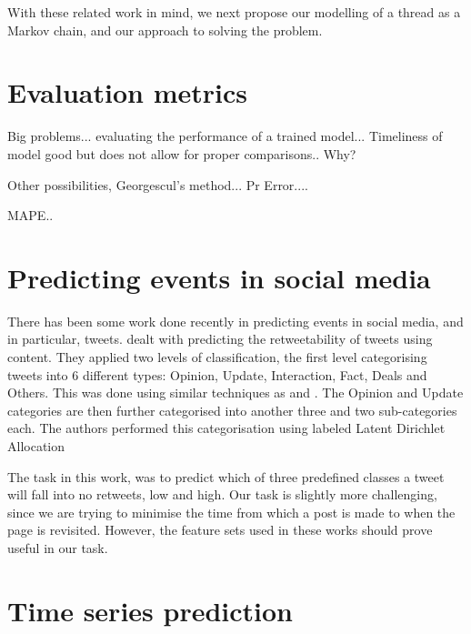 
With these related work in mind, we next propose our modelling of a thread as a 
Markov chain, and our approach to solving the problem.


\section{Evaluation metrics}

Big problems... evaluating the performance of a trained model...
Timeliness of model good but does not allow for proper comparisons.. Why?

Other possibilities, Georgescul's method... Pr Error.... 

MAPE..

\section{Predicting events in social media}
There has been some work done recently in predicting events in social media, and 
in particular, tweets. 
 dealt with predicting the retweetability of tweets using 
content. They applied two levels of classification, the first level categorising 
tweets into 6 different types: Opinion, Update, Interaction, Fact, Deals and 
Others. This was done using similar techniques as  and 
. The Opinion and Update categories are then further 
categorised into another three and two sub-categories each. The authors 
performed this categorisation using labeled Latent Dirichlet Allocation 

The task in this work, was to predict which of three predefined classes a tweet 
will fall into no retweets, low and high. Our task is slightly more challenging, 
since we are trying to minimise the time from which a post is made to when the 
page is revisited. However, the feature sets used in these works should prove 
useful in our task.  

\section{Time series prediction}




